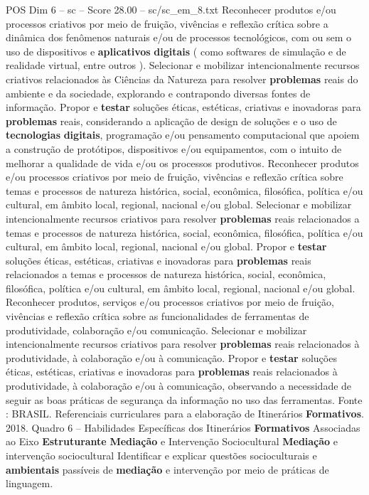 \begin{textsample}{POS Dim 6 – sc – Score 28.00 – sc/sc\_em\_8.txt}
Reconhecer produtos e/ou processos criativos por meio de fruição, vivências e reflexão crítica sobre a dinâmica dos fenômenos naturais e/ou de processos tecnológicos, com ou sem o uso de dispositivos e \textbf{aplicativos} \textbf{digitais} ( como softwares de simulação e de realidade virtual, entre outros ).
Selecionar e mobilizar intencionalmente recursos criativos relacionados às Ciências da Natureza para resolver \textbf{problemas} reais do ambiente e da sociedade, explorando e contrapondo diversas fontes de informação.
Propor e \textbf{testar} soluções éticas, estéticas, criativas e inovadoras para \textbf{problemas} reais, considerando a aplicação de design de soluções e o uso de \textbf{tecnologias} \textbf{digitais}, programação e/ou pensamento computacional que apoiem a construção de protótipos, dispositivos e/ou equipamentos, com o intuito de melhorar a qualidade de vida e/ou os processos produtivos.
Reconhecer produtos e/ou processos criativos por meio de fruição, vivências e reflexão crítica sobre temas e processos de natureza histórica, social, econômica, filosófica, política e/ou cultural, em âmbito local, regional, nacional e/ou global.
Selecionar e mobilizar intencionalmente recursos criativos para resolver \textbf{problemas} reais relacionados a temas e processos de natureza histórica, social, econômica, filosófica, política e/ou cultural, em âmbito local, regional, nacional e/ou global.
Propor e \textbf{testar} soluções éticas, estéticas, criativas e inovadoras para \textbf{problemas} reais relacionados a temas e processos de natureza histórica, social, econômica, filosófica, política e/ou cultural, em âmbito local, regional, nacional e/ou global.
Reconhecer produtos, serviços e/ou processos criativos por meio de fruição, vivências e reflexão crítica sobre as funcionalidades de ferramentas de produtividade, colaboração e/ou comunicação.
Selecionar e mobilizar intencionalmente recursos criativos para resolver \textbf{problemas} reais relacionados à produtividade, à colaboração e/ou à comunicação.
Propor e \textbf{testar} soluções éticas, estéticas, criativas e inovadoras para \textbf{problemas} reais relacionados à produtividade, à colaboração e/ou à comunicação, observando a necessidade de seguir as boas práticas de segurança da informação no uso das ferramentas.
Fonte : BRASIL.
Referenciais curriculares para a elaboração de Itinerários \textbf{Formativos}. 2018.
Quadro 6 – Habilidades Específicas dos Itinerários \textbf{Formativos} Associadas ao Eixo \textbf{Estruturante} \textbf{Mediação} e Intervenção Sociocultural \textbf{Mediação} e intervenção sociocultural Identificar e explicar questões socioculturais e \textbf{ambientais} passíveis de \textbf{mediação} e intervenção por meio de práticas de linguagem.

\end{textsample}
